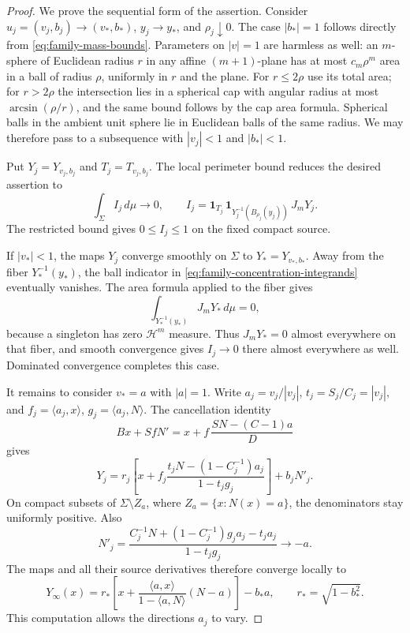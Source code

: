 \begin{proof}
We prove the sequential form of the assertion.  Consider
$u_j=(v_j,b_j)\to(v_*,b_*)$, $y_j\to y_*$, and $\rho_j\downarrow0$.
The case $|b_*|=1$ follows directly from
\eqref{eq:family-mass-bounds}.  Parameters on $|v|=1$ are harmless as
well: an $m$-sphere of Euclidean radius $r$ in any affine
$(m+1)$-plane has at most $c_m\rho^m$ area in a ball of radius $\rho$,
uniformly in $r$ and the plane.  For $r\le2\rho$ use its total area;
for $r>2\rho$ the intersection lies in a spherical cap with angular
radius at most $\arcsin(\rho/r)$, and the same bound follows by the
cap area formula.  Spherical balls in the ambient unit sphere lie in
Euclidean balls of the same radius.  We may therefore pass to a
subsequence with $|v_j|<1$ and $|b_*|<1$.

Put $Y_j=Y_{v_j,b_j}$ and $T_j=T_{v_j,b_j}$.
The local perimeter bound reduces the desired assertion to
\begin{equation}\label{eq:family-concentration-integrands}
 \int_\Sigma I_j\,d\mu\longrightarrow0,
 \qquad
 I_j=\mathbf1_{T_j}\,
      \mathbf1_{Y_j^{-1}(B_{\rho_j}(y_j))}\,J_mY_j.
\end{equation}
The restricted bound gives $0\le I_j\le1$ on the fixed compact source.

If $|v_*|<1$, the maps $Y_j$ converge smoothly on $\Sigma$ to
$Y_*=Y_{v_*,b_*}$.  Away from the fiber $Y_*^{-1}(y_*)$, the ball
indicator in \eqref{eq:family-concentration-integrands} eventually
vanishes.  The area formula applied to the fiber gives
\[
 \int_{Y_*^{-1}(y_*)}J_mY_*\,d\mu=0,
\]
because a singleton has zero $\mathcal H^m$ measure.
Thus $J_mY_*=0$ almost everywhere on that fiber, and smooth
convergence gives $I_j\to0$ there almost everywhere as well.
Dominated convergence completes this case.

It remains to consider $v_*=a$ with $|a|=1$.
Write $a_j=v_j/|v_j|$, $t_j=S_j/C_j=|v_j|$, and
$f_j=\langle a_j,x\rangle$, $g_j=\langle a_j,N\rangle$.
The cancellation identity
\begin{equation}\label{eq:family-cancelled-map}
 Bx+SfN'=x+f\,\frac{SN-(C-1)a}{D}
\end{equation}
gives
\[
 Y_j=r_j\left[x+
 f_j\frac{t_jN-(1-C_j^{-1})a_j}{1-t_jg_j}\right]+b_jN'_j.
\]
On compact subsets of $\Sigma\setminus Z_a$, where
$Z_a=\{x:N(x)=a\}$, the denominators stay uniformly positive.
Also
\[
 N'_j=
 \frac{C_j^{-1}N+(1-C_j^{-1})g_ja_j-t_ja_j}{1-t_jg_j}
 \longrightarrow-a.
\]
The maps and all their source derivatives therefore converge locally
to
\begin{equation}\label{eq:family-infinite-map}
 Y_\infty(x)=r_*\left[x+
       \frac{\langle a,x\rangle}{1-\langle a,N\rangle}(N-a)
                 \right]-b_*a,
 \qquad r_*=\sqrt{1-b_*^2}.
\end{equation}
This computation allows the directions $a_j$ to vary.


\end{proof}
